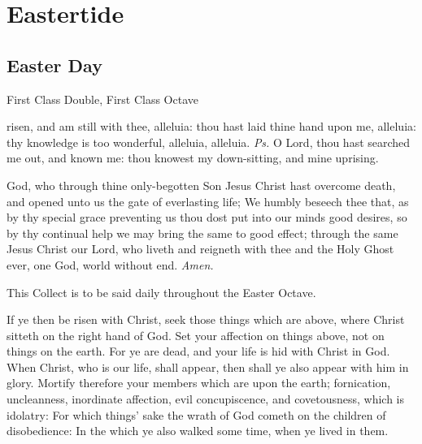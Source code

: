 	\fancyhead[RO,LE]{}
	\fancyhead[RE,LO]{}
	
\section{Eastertide}

\subsection{Easter Day}
\begin{inhead}
    {First Class Double, First Class Octave}
\end{inhead}

\introit
{} risen, and am still with thee, alleluia: thou hast laid thine hand upon me, alleluia: thy knowledge is too wonderful, alleluia, alleluia. \textit{Ps.} O Lord, thou hast searched me out, and known me: thou knowest my down-sitting, and mine uprising.

\collect\label{EasterCollect}
 God, who through thine only-begotten Son Jesus Christ hast overcome death, and opened unto us the gate of everlasting life; We humbly beseech thee that, as by thy special grace preventing us thou dost put into our minds good desires, so by thy continual help we may bring the same to good effect; through the same Jesus Christ our Lord, who liveth and reigneth with thee and the Holy Ghost ever, one God, world without end. \textit{Amen.}
\begin{rubric}
    This Collect is to be said daily throughout the Easter Octave.
\end{rubric}

 If ye then be risen with Christ, seek those things which are above, where Christ sitteth on the right hand of God. Set your affection on things above, not on things on the earth. For ye are dead, and your life is hid with Christ in God. When Christ, who is our life, shall appear, then shall ye also appear with him in glory. Mortify therefore your members which are upon the earth; fornication, uncleanness, inordinate affection, evil concupiscence, and covetousness, which is idolatry: For which things' sake the wrath of God cometh on the children of disobedience: In the which ye also walked some time, when ye lived in them.

